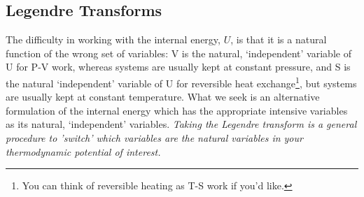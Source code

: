 \documentclass[12pt]{article}
\begin{document}


\subsection{Legendre Transforms} \label{LegendreTransforms}
The difficulty in working with the internal energy, $U$, is that it is a natural function of the wrong set of variables: V is the natural, `independent' variable of U for P-V work, whereas systems are usually kept at constant pressure, and S is the natural `independent' variable of U for reversible heat exchange\footnote{You can think of reversible heating as T-S work if you'd like.}, but systems are usually kept at constant temperature. What we seek is an alternative formulation of the internal energy which has the appropriate intensive variables as its natural, `independent' variables. \emph{Taking the Legendre transform is a general procedure to 'switch' which variables are the natural variables in your thermodynamic potential of interest.}\\
\end{document}

